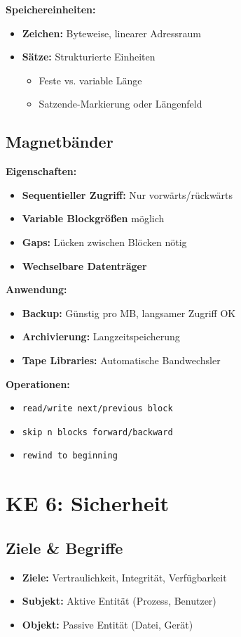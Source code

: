 \documentclass[9pt,a4paper]{extarticle}
\begin{document}
\begin{multicols*}{2}
\textbf{Speichereinheiten:}
\begin{itemize}
\item \textbf{Zeichen:} Byteweise, linearer Adressraum
\item \textbf{Sätze:} Strukturierte Einheiten
  \begin{itemize}
  \item Feste vs. variable Länge
  \item Satzende-Markierung oder Längenfeld
  \end{itemize}
\end{itemize}

\subsection{Magnetbänder}
\textbf{Eigenschaften:}
\begin{itemize}
\item \textbf{Sequentieller Zugriff:} Nur vorwärts/rückwärts
\item \textbf{Variable Blockgrößen} möglich
\item \textbf{Gaps:} Lücken zwischen Blöcken nötig
\item \textbf{Wechselbare Datenträger}
\end{itemize}

\textbf{Anwendung:}
\begin{itemize}
\item \textbf{Backup:} Günstig pro MB, langsamer Zugriff OK
\item \textbf{Archivierung:} Langzeitspeicherung
\item \textbf{Tape Libraries:} Automatische Bandwechsler
\end{itemize}

\textbf{Operationen:}
\begin{itemize}
\item \texttt{read/write next/previous block}
\item \texttt{skip n blocks forward/backward}
\item \texttt{rewind to beginning}
\end{itemize}

\section{KE 6: Sicherheit}

\subsection{Ziele \& Begriffe}
\begin{itemize}
\item \textbf{Ziele:} Vertraulichkeit, Integrität, Verfügbarkeit
\item \textbf{Subjekt:} Aktive Entität (Prozess, Benutzer)
\item \textbf{Objekt:} Passive Entität (Datei, Gerät)
\end{itemize}


\end{multicols*}
\end{document}
